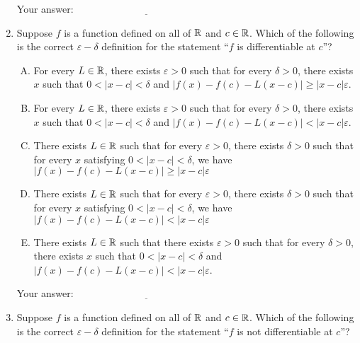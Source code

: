 \documentclass[10pt]{amsart}
\begin{document}
\begin{enumerate}
  \vspace{0.1in}
  Your answer: $\underline{\qquad\qquad\qquad\qquad\qquad\qquad\qquad}$
  \vspace{0.1in}

\item Suppose $f$ is a function defined on all of $\mathbb{R}$ and $c \in
  \mathbb{R}$. Which of the following is the correct $\varepsilon-\delta$
  definition for the statement ``$f$ is differentiable at $c$''?
  

  \begin{enumerate}[(A)]
  \item For every $L \in \mathbb{R}$, there exists $\varepsilon > 0$ such that
    for every $\delta > 0$, there exists $x$ such that $0 < |x - c| <
    \delta$ and $|f(x) - f(c) - L(x - c)| \ge |x - c|\varepsilon$.
  \item For every $L \in \mathbb{R}$, there exists $\varepsilon > 0$ such that
    for every $\delta > 0$, there exists $x$ such that $0 < |x - c| <
    \delta$ and $|f(x) - f(c) - L(x - c)| < |x - c|\varepsilon$.
  \item There exists $L \in \mathbb{R}$ such that for every $\varepsilon > 0$,
  there exists $\delta > 0$ such that for every $x$ satisfying $0 < |x
  - c| < \delta$, we have $|f(x) - f(c) - L(x - c)| \ge |x - c|\varepsilon$
  \item There exists $L \in \mathbb{R}$ such that for every $\varepsilon > 0$,
  there exists $\delta > 0$ such that for every $x$ satisfying $0 < |x
  - c| < \delta$, we have $|f(x) - f(c) - L(x - c)| < |x - c|\varepsilon$
  \item There exists $L \in \mathbb{R}$ such that there exists $\varepsilon > 0$
    such that for every $\delta > 0$, there exists $x$ such that $0 <
    |x - c| < \delta$ and $|f(x) - f(c) - L(x - c)| < |x - c|\varepsilon$.
  \end{enumerate}

  \vspace{0.1in}
  Your answer: $\underline{\qquad\qquad\qquad\qquad\qquad\qquad\qquad}$
  \vspace{0.1in}

\item Suppose $f$ is a function defined on all of $\mathbb{R}$ and $c \in
  \mathbb{R}$. Which of the following is the correct $\varepsilon-\delta$
  definition for the statement ``$f$ is not differentiable at $c$''?


\end{enumerate}
\end{document}
